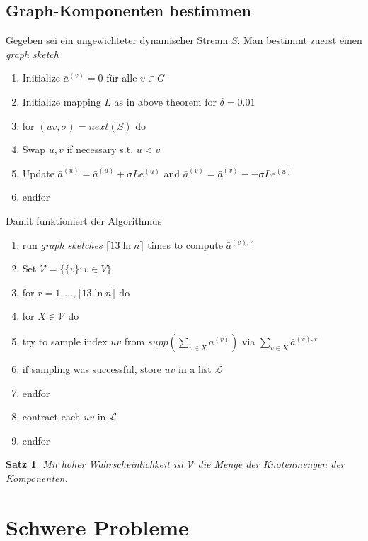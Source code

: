 \documentclass[a4paper, 12pt]{article}
\theoremstyle{plain}
\newtheorem{theorem}{Satz}[subsection] %
\theoremstyle{definition}
\theoremstyle{lemma}
\theoremstyle{remark}
\theoremstyle{corollary}
\theoremstyle{example}
\begin{document}
	\subsection{Graph-Komponenten bestimmen}
	Gegeben sei ein ungewichteter dynamischer Stream $S$. Man bestimmt zuerst einen \textit{graph sketch}
	\begin{enumerate}
		\item Initialize $\bar a^{(v)} = 0$ für alle $v \in G$
		\item Initialize mapping $L$ as in above theorem for $\delta = 0.01$
		\item for $(uv,\sigma) = next(S)$ do
		\item Swap $u,v$ if necessary s.t. $u<v$
		\item Update $\bar a^{(u)} = \bar a^{(u)} + \sigma Le^{(u)}$ and $\bar a^{(v)} = \bar a^{(v)} - - \sigma Le^{(u)}$
		\item endfor
	\end{enumerate}
	Damit funktioniert der Algorithmus \begin{enumerate}
		\item run \textit{graph sketches} $\lceil13 \ln n\rceil$ times to compute $\bar a^{(v),r}$
		\item Set $\mathcal{V} = \{\{v\}: v \in V\}$
		\item for $r=1,...,\lceil13 \ln n\rceil$ do
		\item for $X \in \mathcal{V}$ do
		\item try to sample index $uv$ from $supp(\sum_{v \in X} a^{(v)})$ via $\sum_{v \in X} \bar a^{(v),r}$
		\item if sampling was successful, store $uv$ in a list $\mathcal{L}$
		\item endfor
		\item contract each $uv$ in $\mathcal{L}$
		\item endfor
	\end{enumerate}
	\begin{theorem}
		Mit hoher Wahrscheinlichkeit ist $\mathcal{V}$ die Menge der Knotenmengen der Komponenten.
	\end{theorem}
\section{Schwere Probleme}
\end{document}
